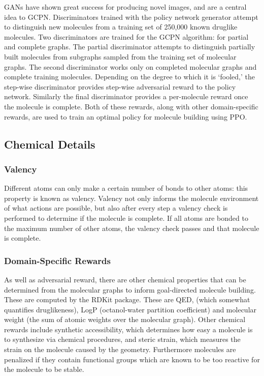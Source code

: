 \documentclass{article}
\begin{document}
GANs have shown great success for producing novel images, and are a central idea to GCPN. Discriminators trained with the policy network generator attempt to distinguish new molecules from a training set of 250,000 known druglike molecules. Two discriminators are trained for the GCPN algorithm: for partial and complete graphs. The partial discriminator attempts to distinguish partially built molecules from subgraphs sampled from the training set of molecular graphs. The second discriminator works only on completed molecular graphs and complete training molecules. Depending on the degree to which it is `fooled,' the step-wise discriminator provides step-wise adversarial reward to the policy network. Similarly the final discriminator provides a per-molecule reward once the molecule is complete. Both of these rewards, along with other domain-specific rewards, are used to train an optimal policy for molecule building using PPO.

\subsection{Chemical Details}
\subsubsection*{Valency}
Different atoms can only make a certain number of bonds to other atoms: this property is known as valency. Valency not only informs the molecule environment of what actions are possible, but also after every step a valency check is performed to determine if the molecule is complete. If all atoms are bonded to the maximum number of other atoms, the valency check passes and that molecule is complete.

\subsubsection*{Domain-Specific Rewards}
As well as adversarial reward, there are other chemical properties that can be determined from the molecular graphs to inform goal-directed molecule building. These are computed by the RDKit package. These are QED, (which somewhat quantifies druglikeness), LogP (octanol-water partition coefficient) and molecular weight (the sum of atomic weights over the molecular graph). Other chemical rewards include synthetic accessibility, which determines how easy a molecule is to synthesize via chemical procedures, and steric strain, which measures the strain on the molecule caused by the geometry. Furthermore molecules are penalized if they contain functional groups which are known to be too reactive for the molecule to be stable.
\end{document}

